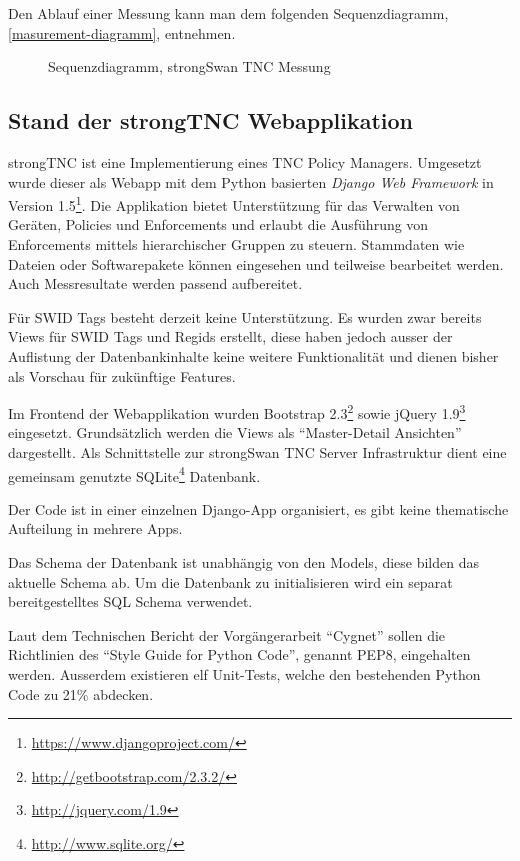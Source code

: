 Den Ablauf einer Messung kann man dem folgenden Sequenzdiagramm,
\autoref{masurement-diagramm}, entnehmen.

\begin{figure}[H]	
	\centering
	
	\caption{Sequenzdiagramm, strongSwan TNC Messung}
	\label{masurement-diagramm}
\end{figure}


\subsection{Stand der strongTNC Webapplikation} 
\label{analyse:stand}

strongTNC ist eine Implementierung eines TNC Policy Managers. Umgesetzt wurde
dieser als Webapp mit dem Python basierten \textit{Django Web Framework} in
Version 1.5\footnote{\url{https://www.djangoproject.com/}}. Die Applikation
bietet Unterstützung für das Verwalten von Geräten, Policies und Enforcements
und erlaubt die Ausführung von Enforcements mittels hierarchischer Gruppen
zu steuern. Stammdaten wie Dateien oder Softwarepakete können eingesehen und
teilweise bearbeitet werden. Auch Messresultate werden passend aufbereitet.

Für SWID Tags besteht derzeit keine Unterstützung. Es wurden zwar bereits Views
für SWID Tags und Regids erstellt, diese haben jedoch ausser der Auflistung der
Datenbankinhalte keine weitere Funktionalität und dienen bisher als Vorschau
für zukünftige Features.

Im Frontend der Webapplikation wurden Bootstrap
2.3\footnote{\url{http://getbootstrap.com/2.3.2/}} sowie jQuery
1.9\footnote{\url{http://jquery.com/1.9}} eingesetzt. Grundsätzlich werden die
Views als \enquote{Master-Detail Ansichten} dargestellt. Als Schnittstelle zur
strongSwan TNC Server Infrastruktur dient eine gemeinsam genutzte
SQLite\footnote{\url{http://www.sqlite.org/}} Datenbank.

Der Code ist in einer einzelnen Django-App organisiert, es gibt keine
thematische Aufteilung in mehrere Apps.

Das Schema der Datenbank ist unabhängig von den Models, diese bilden das
aktuelle Schema ab. Um die Datenbank zu initialisieren wird ein separat
bereitgestelltes SQL Schema verwendet.

Laut dem Technischen Bericht der Vorgängerarbeit
\enquote{Cygnet}\cite{cygnet:2013} sollen die Richtlinien des \enquote{Style
Guide for Python Code}\cite{PEP8:2001}, genannt PEP8, eingehalten werden.
Ausserdem existieren elf Unit-Tests, welche den bestehenden Python Code zu 21\%
abdecken.


